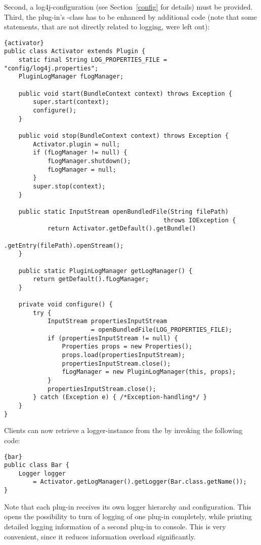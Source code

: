 \documentclass{seal_article}
\begin{document}
Second, a log4j-configuration (see Section~\ref{config} for details) must be provided. Third, the plug-in's -class has to be enhanced by additional code (note that some statements, that are not directly related to logging, were left out): \\

\newpage

\lstset{language=java}
\begin{lstlisting}[frame=tbrl, caption=org.evolizer.foo.Activator -- Establishing logging for a custom plug-in]{activator}
public class Activator extends Plugin {
	static final String LOG_PROPERTIES_FILE = "config/log4j.properties";
	PluginLogManager fLogManager;

	public void start(BundleContext context) throws Exception {
		super.start(context);
		configure();
	}

	public void stop(BundleContext context) throws Exception {
		Activator.plugin = null;
		if (fLogManager != null) {
			fLogManager.shutdown();
			fLogManager = null;
		}
		super.stop(context);
	}

    public static InputStream openBundledFile(String filePath)
    										throws IOException {
            return Activator.getDefault().getBundle()
            							.getEntry(filePath).openStream();
    }
    
	public static PluginLogManager getLogManager() {
		return getDefault().fLogManager; 
	}

	private void configure() {
		try {
			InputStream propertiesInputStream
						= openBundledFile(LOG_PROPERTIES_FILE);		
			if (propertiesInputStream != null) {
				Properties props = new Properties();
				props.load(propertiesInputStream);
				propertiesInputStream.close();
				fLogManager = new PluginLogManager(this, props);
			}
			propertiesInputStream.close();
		} catch (Exception e) { /*Exception-handling*/ }
	}
}
\end{lstlisting}

Clients can now retrieve a logger-instance from the  by invoking the following code:\\

\lstset{language=java}
\begin{lstlisting}[frame=tbrl, caption=org.evolizer.foo.Bar -- Getting a logger-instance]{bar}
public class Bar {
	Logger logger
		= Activator.getLogManager().getLogger(Bar.class.getName());
}
\end{lstlisting}

Note that each plug-in receives its own logger hierarchy and configuration. This opens the possibility to turn of logging of one plug-in completely, while \eg printing detailed logging information of a second plug-in to console. This is very convenient, since it reduces information overload significantly.
\end{document}
